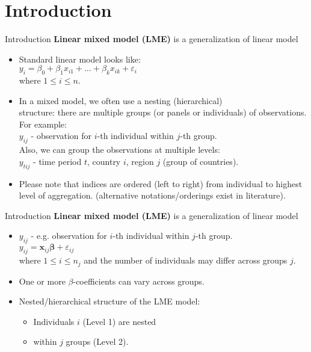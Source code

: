 \documentclass{beamer}
\begin{document}
\section{Introduction}
\begin{frame}{Introduction}
\textbf{Linear mixed model (LME)} is a generalization of linear model
\medskip
\begin{itemize}
\item Standard linear model looks like:\\
\medskip
$y_i = \beta_0 + \beta_1 x_{i1} + \dots + \beta_k x_{ik} + \varepsilon_i$\\
\smallskip
where $ 1 \leq i \leq n$.
\medskip
\item In a mixed model, we often use a nesting (hierarchical) \\structure: there are multiple groups (or panels or individuals) of observations. For example:\\ \medskip
$y_{ij}$ - observation for $i$-th individual within $j$-th group. \\ \smallskip
\medskip
Also, we can group the observations at multiple levels:\\
\medskip
$y_{tij}$ - time period $t$, country $i$, region $j$ (group of countries).\\ 
\bigskip
\item Please note that indices are ordered (left to right) from individual to highest level of aggregation. (alternative notations/orderings exist in literature).
\end{itemize}
\end{frame}
\begin{frame}{Introduction}
\textbf{Linear mixed model (LME)} is a generalization of linear model
\medskip
\begin{itemize}
\item $y_{ij}$ - e.g. observation for $i$-th individual within $j$-th group. \\ \smallskip
\medskip
$y_{ij} =  \bm{x}_{ij}\bm{\beta} + \varepsilon_{ij}$\\
\medskip
where $ 1 \leq i \leq n_j$ and the number of individuals may differ across groups $j$.\\ \bigskip
\item One or more $\beta$-coefficients can vary across groups.
\bigskip
\item Nested/hierarchical structure of the LME model:
\medskip
\begin{itemize}
    \item Individuals $i$ (Level 1) are nested
    \medskip
    \item within $j$ groups (Level 2).
\end{itemize}
\end{itemize}
\end{frame}
\end{document}
